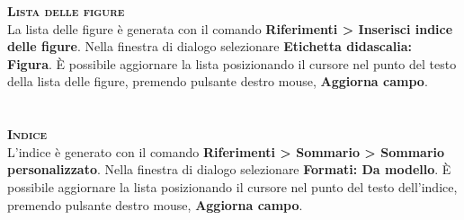 \textbf{\scshape Lista delle figure} \\
La lista delle figure è generata con il comando \textbf{Riferimenti > Inserisci indice delle figure}. Nella finestra di dialogo selezionare \textbf{Etichetta didascalia: Figura}. È possibile aggiornare la lista posizionando il cursore nel punto del testo della lista delle figure, premendo pulsante destro mouse, \textbf{Aggiorna campo}.  \\ \\ \\

\textbf{\scshape Indice} \\
L’indice è generato con il comando \textbf{Riferimenti > Sommario > Sommario personalizzato}. Nella finestra di dialogo selezionare \textbf{Formati: Da modello}. È possibile aggiornare la lista posizionando il cursore nel punto del testo dell’indice, premendo pulsante destro mouse, \textbf{Aggiorna campo}.
